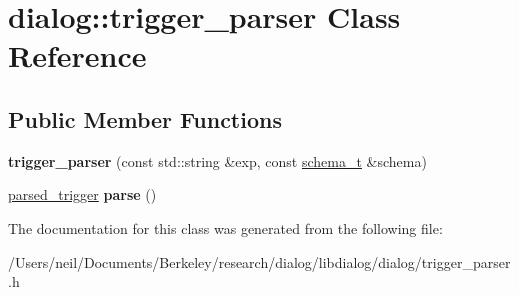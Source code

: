 \hypertarget{classdialog_1_1trigger__parser}{}\section{dialog\+:\+:trigger\+\_\+parser Class Reference}
\label{classdialog_1_1trigger__parser}
\subsection*{Public Member Functions}
\begin{DoxyCompactItemize}
\item 
\mbox{\label{classdialog_1_1trigger__parser_a1ca144dc8f1524b100518ca0bce70e94}} 
{\bfseries trigger\+\_\+parser} (const std\+::string \&exp, const \hyperlink{classdialog_1_1schema__t}{schema\+\_\+t} \&schema)
\item 
\mbox{\label{classdialog_1_1trigger__parser_a685addc92c994e5627740933301a39fe}} 
\hyperlink{structdialog_1_1parsed__trigger}{parsed\+\_\+trigger} {\bfseries parse} ()
\end{DoxyCompactItemize}


The documentation for this class was generated from the following file\+:\begin{DoxyCompactItemize}
\item 
/\+Users/neil/\+Documents/\+Berkeley/research/dialog/libdialog/dialog/trigger\+\_\+parser.\+h\end{DoxyCompactItemize}
